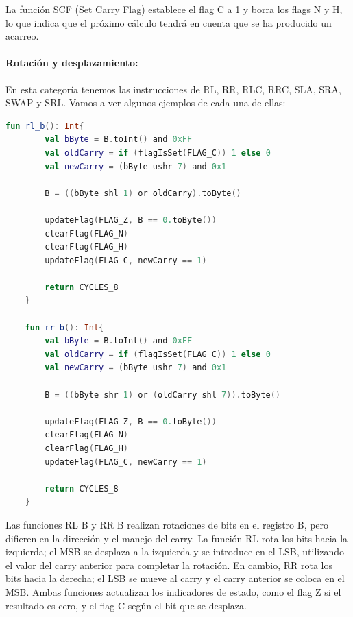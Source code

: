 La función SCF (Set Carry Flag) establece el flag C a 1 y borra los flags N y H, lo que indica que el próximo cálculo tendrá en cuenta que se ha producido un acarreo.

\paragraph{Rotación y desplazamiento:} En esta categoría tenemos las instrucciones de RL, RR, RLC, RRC, SLA, SRA, SWAP y SRL. Vamos a ver algunos ejemplos de cada una de ellas:

\begin{lstlisting}[language=Kotlin, caption={Operaciones RL y RR}, label={code:kotlinrlrr}]
    fun rl_b(): Int{
        val bByte = B.toInt() and 0xFF
        val oldCarry = if (flagIsSet(FLAG_C)) 1 else 0
        val newCarry = (bByte ushr 7) and 0x1

        B = ((bByte shl 1) or oldCarry).toByte()

        updateFlag(FLAG_Z, B == 0.toByte())
        clearFlag(FLAG_N)
        clearFlag(FLAG_H)
        updateFlag(FLAG_C, newCarry == 1)

        return CYCLES_8
    }
    
    fun rr_b(): Int{
        val bByte = B.toInt() and 0xFF
        val oldCarry = if (flagIsSet(FLAG_C)) 1 else 0
        val newCarry = (bByte ushr 7) and 0x1

        B = ((bByte shr 1) or (oldCarry shl 7)).toByte()

        updateFlag(FLAG_Z, B == 0.toByte())
        clearFlag(FLAG_N)
        clearFlag(FLAG_H)
        updateFlag(FLAG_C, newCarry == 1)

        return CYCLES_8
    }
\end{lstlisting}

Las funciones RL B y RR B realizan rotaciones de bits en el registro B, pero difieren en la dirección y el manejo del carry. La función RL rota los bits hacia la izquierda; el MSB se desplaza a la izquierda y se introduce en el LSB, utilizando el valor del carry anterior para completar la rotación. En cambio, RR rota los bits hacia la derecha; el LSB se mueve al carry y el carry anterior se coloca en el MSB. Ambas funciones actualizan los indicadores de estado, como el flag Z si el resultado es cero, y el flag C según el bit que se desplaza.

